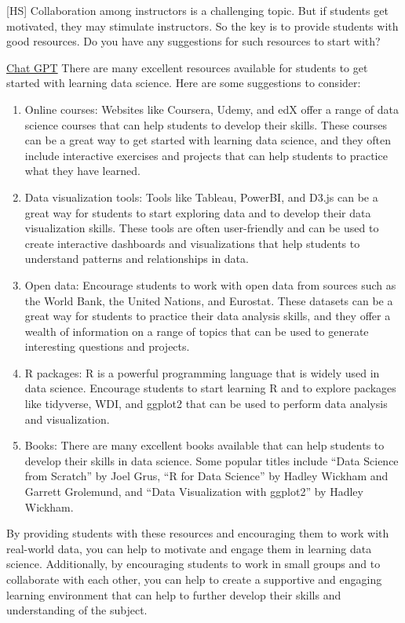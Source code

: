 \documentclass[
]{book}
\providecommand{\tightlist}{%
  \setlength{\itemsep}{0pt}\setlength{\parskip}{0pt}}
\theoremstyle{definition}
\theoremstyle{definition}
\theoremstyle{definition}
\theoremstyle{definition}
\theoremstyle{remark}
\begin{document}
{[}HS{]} Collaboration among instructors is a challenging topic. But if students get motivated, they may stimulate instructors. So the key is to provide students with good resources. Do you have any suggestions for such resources to start with?

\protect\hyperlink{chatgpt}{Chat GPT} There are many excellent resources available for students to get started with learning data science. Here are some suggestions to consider:

\begin{enumerate}
\def\labelenumi{\arabic{enumi}.}
\tightlist
\item
  Online courses: Websites like Coursera, Udemy, and edX offer a range of data science courses that can help students to develop their skills. These courses can be a great way to get started with learning data science, and they often include interactive exercises and projects that can help students to practice what they have learned.
\item
  Data visualization tools: Tools like Tableau, PowerBI, and D3.js can be a great way for students to start exploring data and to develop their data visualization skills. These tools are often user-friendly and can be used to create interactive dashboards and visualizations that help students to understand patterns and relationships in data.
\item
  Open data: Encourage students to work with open data from sources such as the World Bank, the United Nations, and Eurostat. These datasets can be a great way for students to practice their data analysis skills, and they offer a wealth of information on a range of topics that can be used to generate interesting questions and projects.
\item
  R packages: R is a powerful programming language that is widely used in data science. Encourage students to start learning R and to explore packages like tidyverse, WDI, and ggplot2 that can be used to perform data analysis and visualization.
\item
  Books: There are many excellent books available that can help students to develop their skills in data science. Some popular titles include ``Data Science from Scratch'' by Joel Grus, ``R for Data Science'' by Hadley Wickham and Garrett Grolemund, and ``Data Visualization with ggplot2'' by Hadley Wickham.
\end{enumerate}

By providing students with these resources and encouraging them to work with real-world data, you can help to motivate and engage them in learning data science. Additionally, by encouraging students to work in small groups and to collaborate with each other, you can help to create a supportive and engaging learning environment that can help to further develop their skills and understanding of the subject.
\end{document}
